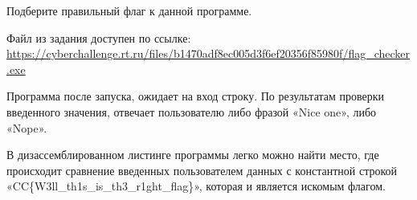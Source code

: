 
Подберите правильный флаг к данной программе.

Файл из задания доступен по ссылке: \url{https://cyberchallenge.rt.ru/files/b1470adf8ec005d3f6ef20356f85980f/flag_checker.exe}

\solutionSection

Программа после запуска, ожидает на вход строку. По результатам проверки введенного значения, отвечает пользователю либо фразой «Nice one», либо «Nope».

В дизассемблированном листинге программы легко можно найти место, где происходит сравнение введенных пользователем данных с константной строкой «CC\{W3ll\_th1s\_is\_th3\_r1ght\_flag\}», которая и является искомым флагом.
 

